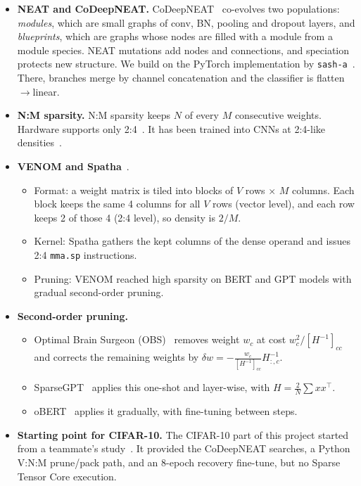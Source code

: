 \documentclass[10pt,a4paper]{article}
\makeatletter
\newcommand{\B}[1]{\textbf{#1}}
\renewcommand\section{\@startsection{section}{1}{\z@}{-1.8ex plus -.4ex}{0.8ex}{\normalfont\large\bfseries}}
\makeatother
\begin{document}
\section{Prior work}
\begin{itemize}
\item \B{NEAT and CoDeepNEAT.} CoDeepNEAT~\cite{codeepneat} co-evolves two populations: \emph{modules}, which are small graphs of conv, BN, pooling and dropout layers, and \emph{blueprints}, which are graphs whose nodes are filled with a module from a module species. NEAT mutations add nodes and connections, and speciation protects new structure. We build on the PyTorch implementation by \texttt{sash-a}~\cite{codeepneat_code}. There, branches merge by channel concatenation and the classifier is flatten$\to$linear.
\item \B{N:M sparsity.} N:M sparsity keeps $N$ of every $M$ consecutive weights. Hardware supports only 2:4~\cite{nm_nvidia}. It has been trained into CNNs at 2:4-like densities~\cite{nm_zhou}.
\item \B{VENOM and Spatha}~\cite{venom,venom_code}.
  \begin{itemize}
  \item Format: a weight matrix is tiled into blocks of $V$ rows $\times$ $M$ columns. Each block keeps the same 4 columns for all $V$ rows (vector level), and each row keeps 2 of those 4 (2:4 level), so density is $2/M$.
  \item Kernel: Spatha gathers the kept columns of the dense operand and issues 2:4 \texttt{mma.sp} instructions.
  \item Pruning: VENOM reached high sparsity on BERT and GPT models with gradual second-order pruning.
  \end{itemize}
\item \B{Second-order pruning.}
  \begin{itemize}
  \item Optimal Brain Surgeon (OBS)~\cite{obs} removes weight $w_c$ at cost $w_c^2/[H^{-1}]_{cc}$ and corrects the remaining weights by $\delta w=-\tfrac{w_c}{[H^{-1}]_{cc}}H^{-1}_{:,c}$.
  \item SparseGPT~\cite{sparsegpt} applies this one-shot and layer-wise, with $H=\tfrac{2}{N}\sum xx^\top$.
  \item oBERT~\cite{obert} applies it gradually, with fine-tuning between steps.
  \end{itemize}
\item \B{Starting point for CIFAR-10.} The CIFAR-10 part of this project started from a teammate's study~\cite{anirudh_code}. It provided the CoDeepNEAT searches, a Python V:N:M prune/pack path, and an 8-epoch recovery fine-tune, but no Sparse Tensor Core execution.
\end{itemize}
\end{document}

